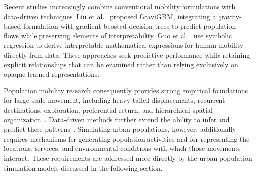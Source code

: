 
Recent studies increasingly combine conventional mobility formulations with data-driven techniques. Liu et al.~\cite{liu2024GraviGBM} proposed GraviGBM, integrating a gravity-based formulation with gradient-boosted decision trees to predict population flows while preserving elements of interpretability. Guo et al.~\cite{guo2025datadrivendiscoveryhuman} use symbolic regression to derive interpretable mathematical expressions for human mobility directly from data. These approaches seek predictive performance while retaining explicit relationships that can be examined rather than relying exclusively on opaque learned representations.


Population mobility research consequently provides strong empirical foundations for large-scale movement, including heavy-tailed displacements, recurrent destinations, exploration, preferential return, and hierarchical spatial organization~\cite{brockmann2006scaling,gonzalez2008understanding,natureSong2010exploration,alessandretti2020nature}. Data-driven methods further extend the ability to infer and predict these patterns~\cite{liu2024GraviGBM,guo2025datadrivendiscoveryhuman}. Simulating urban populations, however, additionally requires mechanisms for generating population activities and for representing the locations, services, and environmental conditions with which those movements interact. These requirements are addressed more directly by the urban population simulation models discussed in the following section.

